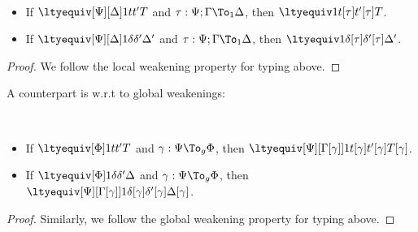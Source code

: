 \begin{lemma} $ $
  \begin{itemize}
  \item If $\ltyequiv[\Psi][\Delta] 1 t{t'} T$ and $\tau : \Psi; \Gamma \To_1 \Delta$,
    then $\ltyequiv 1 {t[\tau]}{t'[\tau]} T$.
  \item If $\ltyequiv[\Psi][\Delta] 1 \delta{\delta'} \Delta'$ and
    $\tau : \Psi; \Gamma \To_1 \Delta$, then
    $\ltyequiv 1 {\delta[\tau]}{\delta'[\tau]} \Delta'$.
  \end{itemize}
\end{lemma}
\begin{proof}
  We follow the local weakening property for typing above. 
\end{proof}

A counterpart is w.r.t to global weakenings:
\begin{lemma} $ $
  \begin{itemize}
  \item If $\ltyequiv[\Phi] 1 t{t'} T$ and $\gamma : \Psi \To_g \Phi$,
    then $\ltyequiv[\Psi][\Gamma[\gamma]] 1 {t[\gamma]}{t'[\gamma]}{T[\gamma]}$.
  \item If $\ltyequiv[\Phi] 1 \delta{\delta'} \Delta$ and $\gamma : \Psi \To_g \Phi$,
    then $\ltyequiv[\Psi][\Gamma[\gamma]] 1 {\delta[\gamma]}{\delta'[\gamma]}{\Delta[\gamma]}$.
  \end{itemize}
\end{lemma}
\begin{proof}
  Similarly, we follow the global weakening property for typing above. 
\end{proof}


